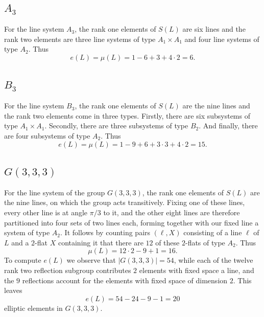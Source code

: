 \documentclass[11pt, reqno]{amsart}
\numberwithin{equation}{section}
\theoremstyle{definition}
\theoremstyle{plain}
\begin{document}
\subsection{$A_3$} For the line system $A_3$, the rank one elements of $S(L)$ are six lines and the rank two elements are three line systems of type $A_1 \times A_1$ and four line systems of type $A_2$. Thus
$$e(L)=\mu(L)=1-6+3+4\cdot2=6.$$

\subsection{$B_3$} For the line system $B_3$, the rank one elements of $S(L)$ are the nine lines and the rank two elements come in three types. Firstly, there are six subsystems of type $A_1 \times A_1$. Secondly, there are three subsystems of type $B_2$. And finally, there are four subsystems of type $A_2$. Thus
$$e(L)=\mu(L)=1-9+6+3 \cdot 3+4 \cdot 2=15.$$

\subsection{$G(3,3,3)$} For the line system of the group $G(3,3,3)$, the rank one elements of $S(L)$ are the nine lines, on which the group acts transitively. Fixing one of these lines, every other line is at angle $\pi/3$ to it, and the other eight lines are therefore partitioned into four sets of two lines each, forming together with our fixed line a system of type $A_2$. It follows by counting pairs $(\ell,X)$ consisting of a line $\ell$ of $L$ and a $2$-flat $X$ containing it that there are $12$ of these $2$-flats of type $A_2$. Thus
$$\mu(L)=12 \cdot 2-9+1=16.$$ To compute $e(L)$ we observe that $|G(3,3,3)|=54$, while each of the twelve rank two reflection subgroup contributes $2$ elements with fixed space a line, and the $9$ reflections account for the elements with fixed space of dimension $2$. This leaves $$e(L)=54-24-9-1=20$$ elliptic elements in $G(3,3,3)$.
\end{document}
